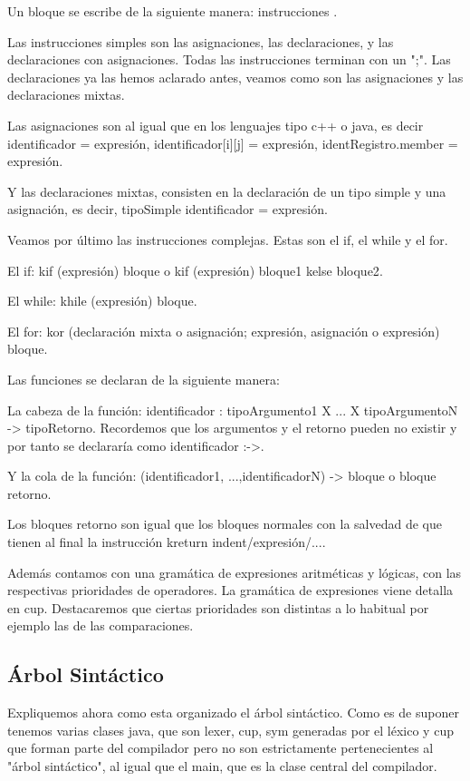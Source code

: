 \documentclass[a4paper, 11pt, twoside, openany, onecolumn, final]{memoir}
\begin{document}
	Un bloque se escribe de la siguiente manera: { instrucciones }.
	
	Las instrucciones simples son las asignaciones, las declaraciones, y las declaraciones con asignaciones. Todas las instrucciones terminan con un ";".	Las declaraciones ya las hemos aclarado antes, veamos como son las asignaciones y las declaraciones mixtas. 
	
	Las asignaciones son al igual que en los lenguajes tipo c++ o java, es decir identificador = expresión, identificador[i][j] = expresión, identRegistro.member = expresión.
	
	Y las declaraciones mixtas, consisten en la declaración de un tipo simple y una asignación, es decir, tipoSimple identificador = expresión.
	
	Veamos por último las instrucciones complejas. Estas son el if, el while y el for.
	
	El if: kif (expresión) {bloque} o kif (expresión) {bloque1} kelse {bloque2}.
	
	El while: khile (expresión) {bloque}.
	
	El for: kor (declaración mixta o asignación; expresión, asignación o expresión) {bloque}.
	
	Las funciones se declaran de la siguiente manera:	
	 
	 La cabeza de la función:
	identificador : tipoArgumento1 X ... X tipoArgumentoN -> tipoRetorno. Recordemos que los argumentos y el retorno pueden no existir y por tanto se declararía como identificador :->.

	Y la cola de la función:
	(identificador1, ...,identificadorN) -> {bloque o bloque retorno}.
	
	Los bloques retorno son igual que los bloques normales con la salvedad de que tienen al final la instrucción kreturn indent/expresión/....
	
	Además contamos con una gramática de expresiones aritméticas y lógicas, con las respectivas prioridades de operadores. La gramática de expresiones viene detalla en cup. Destacaremos que ciertas prioridades son distintas a lo habitual por ejemplo las de las comparaciones.
	
	\subsection{Árbol Sintáctico}
	Expliquemos ahora como esta organizado el árbol sintáctico.
		Como es de suponer tenemos varias clases java, que son lexer, cup, sym generadas por el léxico y cup que forman parte del compilador pero no son estrictamente pertenecientes al "árbol sintáctico", al igual que el main, que es la clase central del compilador.
		
\end{document}
